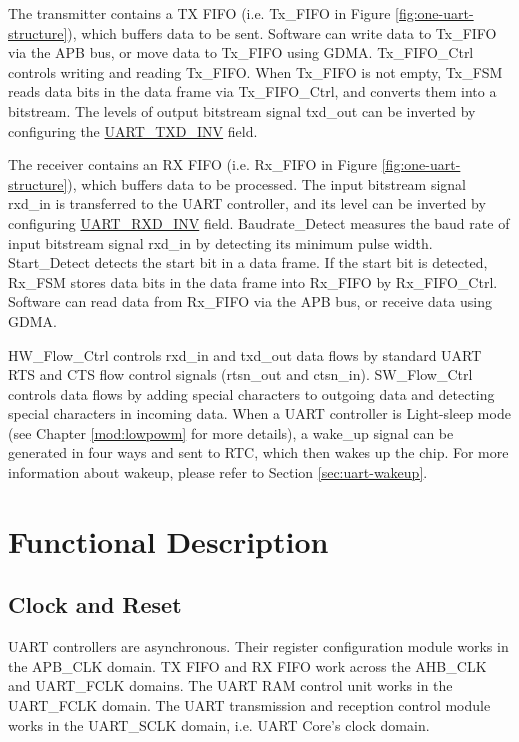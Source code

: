 \documentclass[main\_\_EN.tex]{subfiles}
\begin{document}
The transmitter contains a TX FIFO (i.e. Tx\_FIFO in Figure \ref{fig:one-uart-structure}), which buffers data to be sent. Software can write data to Tx\_FIFO via the APB bus, or move data to Tx\_FIFO using GDMA. Tx\_FIFO\_Ctrl controls writing and reading Tx\_FIFO. When Tx\_FIFO is not empty, Tx\_FSM reads data bits in the data frame via Tx\_FIFO\_Ctrl, and converts them into a bitstream. The levels of output bitstream signal txd\_out can be inverted by configuring the \hyperref[fielddesc:UARTTXDINV]{UART\_TXD\_INV} field.

The receiver contains an RX FIFO (i.e. Rx\_FIFO in Figure \ref{fig:one-uart-structure}), which buffers data to be processed. The input bitstream signal rxd\_in is transferred to the UART controller, and its level can be inverted by configuring \hyperref[fielddesc:UARTRXDINV]{UART\_RXD\_INV} field. Baudrate\_Detect measures the baud rate of input bitstream signal rxd\_in by detecting its minimum pulse width. Start\_Detect detects the start bit in a data frame. If the start bit is detected, Rx\_FSM stores data bits in the data frame into Rx\_FIFO by Rx\_FIFO\_Ctrl. Software can read data from Rx\_FIFO via the APB bus, or receive data using GDMA.

HW\_Flow\_Ctrl controls rxd\_in and txd\_out data flows by standard UART RTS and CTS flow control signals (rtsn\_out and ctsn\_in). SW\_Flow\_Ctrl controls data flows by adding special characters to outgoing data and detecting special characters in incoming data. When a UART controller is Light-sleep mode (see Chapter \ref{mod:lowpowm} \textit{} for more details), a wake\_up signal can be generated in four ways and sent to RTC, which then wakes up the \chipname{} chip. For more information about wakeup, please refer to Section \ref{sec:uart-wakeup}.

\section{Functional Description}

\subsection{Clock and Reset}

UART controllers are asynchronous. Their register configuration module works in the APB\_CLK domain. TX FIFO and RX FIFO work across the AHB\_CLK and UART\_FCLK domains. The UART RAM control unit works in the UART\_FCLK domain. The UART transmission and reception control module works in the UART\_SCLK domain, i.e. UART Core's clock domain.
\end{document}
